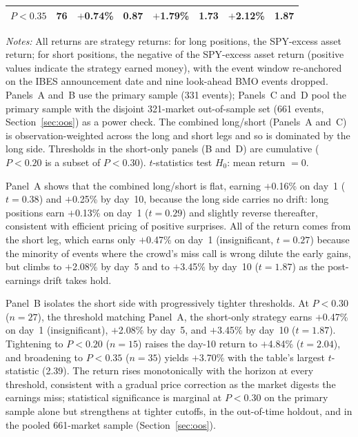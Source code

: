 \documentclass[11pt]{article}
\begin{document}
\begin{table}[htbp]
\begin{threeparttable}
\begin{tabular}{lccccccc}
$P < 0.35$ & 76 & $+$0.74\% & 0.87 & $+$1.79\% & 1.73 & $+$2.12\% & 1.87 \\
\bottomrule
\end{tabular}
\begin{tablenotes}
\small
\item \textit{Notes:} All returns are strategy returns: for long positions, the SPY-excess asset return; for short positions, the negative of the SPY-excess asset return (positive values indicate the strategy earned money), with the event window re-anchored on the IBES announcement date and nine look-ahead BMO events dropped. Panels~A and~B use the primary sample (331 events); Panels~C and~D pool the primary sample with the disjoint 321-market out-of-sample set (661 events, Section~\ref{sec:oos}) as a power check. The combined long/short (Panels~A and~C) is observation-weighted across the long and short legs and so is dominated by the long side. Thresholds in the short-only panels (B and~D) are cumulative ($P < 0.20$ is a subset of $P < 0.30$). $t$-statistics test $H_0$: mean return $= 0$.
\end{tablenotes}
\end{threeparttable}
\end{table}

Panel~A shows that the combined long/short is flat, earning $+$0.16\% on day~1 ($t = 0.38$) and $+$0.25\% by day~10, because the long side carries no drift: long positions earn $+$0.13\% on day~1 ($t = 0.29$) and slightly reverse thereafter, consistent with efficient pricing of positive surprises. All of the return comes from the short leg, which earns only $+$0.47\% on day~1 (insignificant, $t = 0.27$) because the minority of events where the crowd's miss call is wrong dilute the early gains, but climbs to $+$2.08\% by day~5 and to $+$3.45\% by day~10 ($t = 1.87$) as the post-earnings drift takes hold.

Panel~B isolates the short side with progressively tighter thresholds. At $P < 0.30$ ($n = 27$), the threshold matching Panel~A, the short-only strategy earns $+$0.47\% on day~1 (insignificant), $+$2.08\% by day~5, and $+$3.45\% by day~10 ($t = 1.87$). Tightening to $P < 0.20$ ($n = 15$) raises the day-10 return to $+$4.84\% ($t = 2.04$), and broadening to $P < 0.35$ ($n = 35$) yields $+$3.70\% with the table's largest $t$-statistic (2.39). The return rises monotonically with the horizon at every threshold, consistent with a gradual price correction as the market digests the earnings miss; statistical significance is marginal at $P < 0.30$ on the primary sample alone but strengthens at tighter cutoffs, in the out-of-time holdout, and in the pooled 661-market sample (Section~\ref{sec:oos}).
\end{document}
